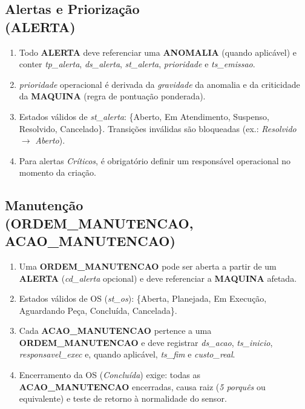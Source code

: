\documentclass[a4paper,10pt]{article}
\let\oldtextbf\textbf
\renewcommand{\textbf}[1]{{\footnotesize\oldtextbf{#1}}}
\begin{document}
\subsection*{\small Alertas e Priorização \\ (ALERTA)}
\begin{enumerate}[label=RN-4.\arabic*, font=\footnotesize]
\item Todo \textbf{ALERTA} deve referenciar uma \textbf{ANOMALIA} (quando aplicável) e conter \textit{tp\_alerta}, \textit{ds\_alerta}, \textit{st\_alerta}, \textit{prioridade} e \textit{ts\_emissao}.
\item \textit{prioridade} operacional é derivada da \textit{gravidade} da anomalia e da criticidade da \textbf{MAQUINA} (regra de pontuação ponderada).
\item Estados válidos de \textit{st\_alerta}: \{Aberto, Em Atendimento, Suspenso, Resolvido, Cancelado\}. Transições inválidas são bloqueadas (ex.: \textit{Resolvido} $\rightarrow$ \textit{Aberto}).
\item Para alertas \textit{Críticos}, é obrigatório definir um responsável operacional no momento da criação.
\end{enumerate}

\subsection*{\small Manutenção \\ (ORDEM\_MANUTENCAO, ACAO\_MANUTENCAO)}
\begin{enumerate}[label=RN-5.\arabic*, font=\footnotesize]
\item Uma \textbf{ORDEM\_MANUTENCAO} pode ser aberta a partir de um \textbf{ALERTA} (\textit{cd\_alerta} opcional) e deve referenciar a \textbf{MAQUINA} afetada.
\item Estados válidos de OS (\textit{st\_os}): \{Aberta, Planejada, Em Execução, Aguardando Peça, Concluída, Cancelada\}.
\item Cada \textbf{ACAO\_MANUTENCAO} pertence a uma \textbf{ORDEM\_MANUTENCAO} e deve registrar \textit{ds\_acao}, \textit{ts\_inicio}, \textit{responsavel\_exec} e, quando aplicável, \textit{ts\_fim} e \textit{custo\_real}.
\item Encerramento da OS (\textit{Concluída}) exige: todas as \textbf{ACAO\_MANUTENCAO} encerradas, causa raiz (\emph{5 porquês} ou equivalente) e teste de retorno à normalidade do sensor.
\end{enumerate}
\end{document}
